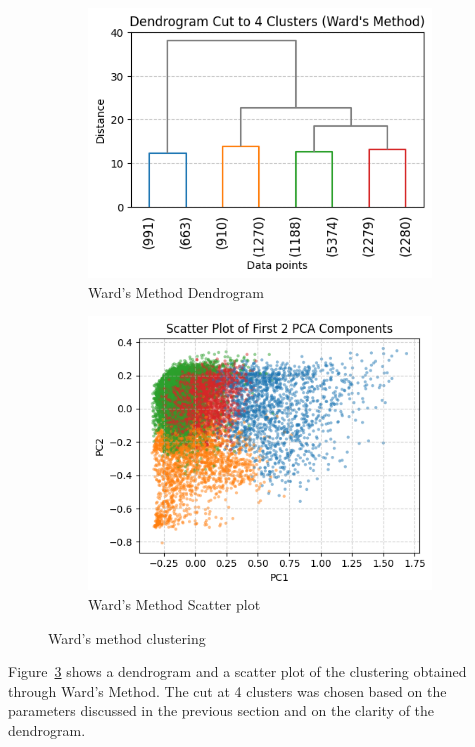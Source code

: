 \begin{figure}[H]
    \centering
    \begin{subfigure}[b]{0.45\textwidth}
        \centering
        \includegraphics[width=\textwidth]{plots/dendrogram_4.png}
        \caption{Ward's Method Dendrogram}
        \label{fig:dendrogram_ward}
    \end{subfigure}
    \begin{subfigure}[b]{0.45\textwidth}
        \centering
        \includegraphics[width=\textwidth]{plots/scatter_ward.png}
        \caption{Ward's Method Scatter plot}
        \label{fig:scatter_ward}
    \end{subfigure}
    \caption{Ward's method clustering}
    \label{fig:dendrograms_ward}
\end{figure}
Figure~\ref{fig:dendrograms_ward} shows a dendrogram and a scatter plot of the clustering obtained through
Ward's Method. The cut at 4 clusters was chosen based on the parameters discussed in the previous section
and on the clarity of the dendrogram.\\

